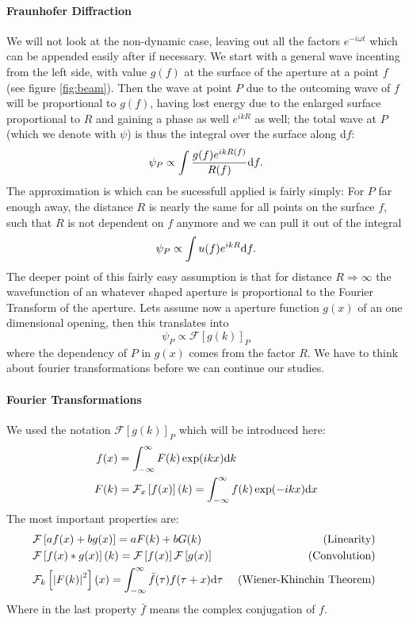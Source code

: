 \paragraph{Fraunhofer Diffraction}
We will not look at the non-dynamic case, leaving out all the factors $e^{-i\omega t}$ which can be appended
easily after if necessary. We start with a general wave incenting from the left side, with value $g(f)$ at the
surface of the aperture at a point $f$ (see figure \ref{fig:beam}). Then the wave at point $P$ due to the
outcoming wave of $f$ will
be proportional to $g(f)$, having lost
energy due to the enlarged surface proportional to $R$ and gaining a phase as well $e^{ikR}$ as well; 
the total wave at $P$ (which we denote with $\psi$) is thus the integral over the surface along d$f$: 
\begin{equation}
    \label{eq:int1}
    \psi_P \propto \int \frac{g(f) e^{ikR(f)}}{R(f)}\mathrm{d} f.
\end{equation}
The approximation is which can be sucessfull applied is fairly simply: For $P$ far enough away, the distance
$R$ is nearly the same for all points on the surface $f$, such that $R$ is not dependent on $f$ anymore and
we can pull it out of the integral
\begin{equation}
    \label{eq:int1}
    \psi_P \propto \int u(f) e^{ikR}\mathrm{d} f.
\end{equation}
The deeper point of this fairly easy assumption is that for distance $R \Rightarrow \infty$ the wavefunction
of an whatever shaped aperture is proportional to the Fourier Transform of the aperture. Lets assume
now a aperture function $g(x)$ of an one dimensional opening, then this translates into
\begin{equation}
    \psi_P \propto \mathcal{F} \left[g(k)\right ]_P
\end{equation}
where the dependency of $P$ in $g(x)$ comes from the factor $R$.
We have to think about fourier transformations before we can continue our studies.
\paragraph{Fourier Transformations}
We used the notation  $\mathcal{F} \left[g(k)\right ]_P$ which will be introduced here:
\begin{align}
f(x) &= \int_{-\infty}^{\infty} F(k)\exp(i kx)\mathrm{d} k\\
F(k) &= \mathcal{F}_x\left [f(x)\right ](k) =
\int_{-\infty}^{\infty} f(k)\exp(-i kx) \mathrm{d} x
\end{align}
The most important properties are:
\begin{align}
    \label{eq:fourier}
&\mathcal{F}\left [a f(x) + b g(x)\right ]
    = a F(k) + b G(k) 
    &\mbox{ (Linearity) }\\
&\mathcal{F}\left [f(x) * g(x)\right ](k)
    = \mathcal{F}\left [f(x)\right ]\mathcal{F}\left [g(x)\right ]
    \! &\mbox{ (Convolution) }\\
&\mathcal{F}_k\left [\left | F(k) \right |^2\right ](x)
   =  \int_{-\infty}^{\infty}\bar{f}(\tau)f(\tau + x) \mathrm{d}\tau 
   &\mbox{ (Wiener-Khinchin Theorem) }
\end{align}
Where in the last property $\bar{f}$ means the complex conjugation of $f$.
